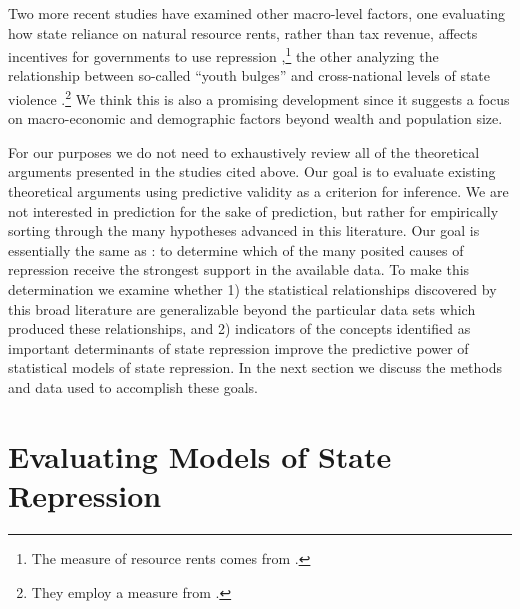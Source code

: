\documentclass[12pt]{article}
\begin{document}
Two more recent studies have examined other macro-level factors, one evaluating how state reliance on natural resource rents, rather than tax revenue, affects incentives for governments to use repression \citep{DemerittYoung2013},\footnote{The measure of resource rents comes from \citet{Ross2006}.} the other analyzing the relationship between so-called ``youth bulges'' and cross-national levels of state violence \citep{NordaasDavenport2013}.\footnote{They employ a measure from \citet{Urdal2006}.} We think this is also a promising development since it suggests a focus on macro-economic and demographic factors beyond wealth and population size. 

For our purposes we do not need to exhaustively review all of the theoretical arguments presented in the studies cited above. Our goal is to evaluate existing theoretical arguments using predictive validity as a criterion for inference. We are not interested in prediction for the sake of prediction, but rather for empirically sorting through the many hypotheses advanced in this literature. Our goal is essentially the same as \citet{PoeTate1994}: to determine which of the many posited causes of repression receive the strongest support in the available data. To make this determination we examine whether 1) the statistical relationships discovered by this broad literature are generalizable beyond the particular data sets which produced these relationships, and 2) indicators of the concepts identified as important determinants of state repression improve the predictive power of statistical models of state repression. In the next section we discuss the methods and data used to accomplish these goals.

\section{Evaluating Models of State Repression}
 
\end{document}
